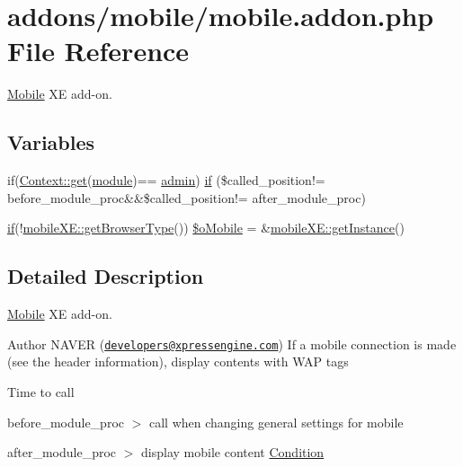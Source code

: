 \hypertarget{mobile_8addon_8php}{}\section{addons/mobile/mobile.addon.\+php File Reference}
\label{mobile_8addon_8php}


\hyperlink{classMobile}{Mobile} X\+E add-\/on.  


\subsection*{Variables}
\begin{DoxyCompactItemize}
\item 
if(\hyperlink{classContext_a90ce25d65fe6c9778421cbb36ab3def5}{Context\+::get}(\textquotesingle{}\hyperlink{classmodule}{module}\textquotesingle{})== \textquotesingle{}\hyperlink{classadmin}{admin}\textquotesingle{}) \hyperlink{mobile_8addon_8php_a13d720e0d3597438cb76873850ce4b63}{if} (\$called\+\_\+position!= \textquotesingle{}before\+\_\+module\+\_\+proc\textquotesingle{}\&\&\$called\+\_\+position!= \textquotesingle{}after\+\_\+module\+\_\+proc\textquotesingle{})
\item 
\hyperlink{config_8inc_8php_ac202e21c80d0f28d495d074d3c23e1ca}{if}(!\hyperlink{classmobileXE_a462a4900af63aa2bfbcea2168afbe876}{mobile\+X\+E\+::get\+Browser\+Type}()) \hyperlink{mobile_8addon_8php_a2e1472c6f1bb5b341e95a632164904d0}{\$o\+Mobile} = \&\hyperlink{classmobileXE_a11db662f7f05a929e2559ee6d42fca2c}{mobile\+X\+E\+::get\+Instance}()
\end{DoxyCompactItemize}


\subsection{Detailed Description}
\hyperlink{classMobile}{Mobile} X\+E add-\/on. 

\begin{DoxyAuthor}{Author}
N\+A\+V\+E\+R (\href{mailto:developers@xpressengine.com}{\tt developers@xpressengine.\+com}) If a mobile connection is made (see the header information), display contents with W\+A\+P tags
\end{DoxyAuthor}
Time to call

before\+\_\+module\+\_\+proc $>$ call when changing general settings for mobile

after\+\_\+module\+\_\+proc $>$ display mobile content \hyperlink{classCondition}{Condition} 


